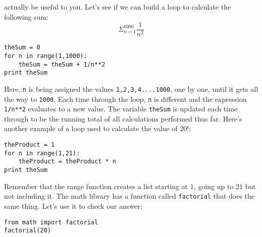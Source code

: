 actually be useful to you.  Let's see if we can build a loop to
calculate the following sum:
\begin{equation}
\Sigma_{n=1}^{1000} \frac{1}{n^2}
\end{equation}
\begin{Verbatim}
theSum = 0
for n in range(1,1000):
    theSum = theSum + 1/n**2
print theSum
\end{Verbatim}
Here, \texttt{n} is being assigned the values
\texttt{1,2,3,4....1000}, one by one, until it gets all the way to
\texttt{1000}.  Each time through the loop, \texttt{n} is different
and the expression \texttt{1/n**2} evaluates to a new value.  The
variable \texttt{theSum} is updated each time through to be the
running total of all calculations performed thus far.  Here's another
example of a loop used to calculate the value of $20!$:
\begin{Verbatim}
theProduct = 1
for n in range(1,21):  
    theProduct = theProduct * n
print theSum
\end{Verbatim}
Remember that the range function creates a list starting at $1$, going
up to $21$ but not including it. The math library has a function
called \texttt{factorial} that does the same thing.  Let's use it to
check our answer:

\begin{Verbatim}
from math import factorial
factorial(20)
\end{Verbatim}

